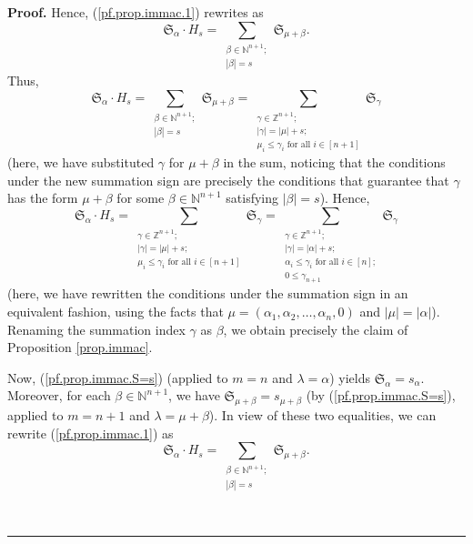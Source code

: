 \documentclass[numbers=enddot,12pt,final,onecolumn,notitlepage,english]{scrartcl}%
\theoremstyle{definition}
\newenvironment{proof}[1][Proof]{\noindent\textbf{#1.} }{\ \rule{0.5em}{0.5em}}
\let\sumnonlimits\sum
\renewcommand{\sum}{\sumnonlimits\limits}
\newenvironment{verlong}{}{}
\newenvironment{vershort}{}{}
\begin{document}
\begin{proof}
\begin{vershort}
Hence, (\ref{pf.prop.immac.1}) rewrites as
\begin{equation}
\mathfrak{S}_{\alpha}\cdot H_{s}=\sum_{\substack{\beta\in\mathbb{N}%
^{n+1};\\\left\vert \beta\right\vert =s}}\mathfrak{S}_{\mu+\beta}.
\label{pf.prop.immac.short.2}%
\end{equation}
Thus,
\[
\mathfrak{S}_{\alpha}\cdot H_{s}=\sum_{\substack{\beta\in\mathbb{N}%
^{n+1};\\\left\vert \beta\right\vert =s}}\mathfrak{S}_{\mu+\beta}%
=\sum_{\substack{\gamma\in\mathbb{Z}^{n+1};\\\left\vert \gamma\right\vert
=\left\vert \mu\right\vert +s;\\\mu_{i}\leq\gamma_{i}\text{ for all }%
i\in\left[  n+1\right]  }}\mathfrak{S}_{\gamma}%
\]
(here, we have substituted $\gamma$ for $\mu+\beta$ in the sum, noticing that
the conditions under the new summation sign are precisely the conditions that
guarantee that $\gamma$ has the form $\mu+\beta$ for some $\beta\in
\mathbb{N}^{n+1}$ satisfying $\left\vert \beta\right\vert =s$). Hence,%
\[
\mathfrak{S}_{\alpha}\cdot H_{s}=\sum_{\substack{\gamma\in\mathbb{Z}%
^{n+1};\\\left\vert \gamma\right\vert =\left\vert \mu\right\vert +s;\\\mu
_{i}\leq\gamma_{i}\text{ for all }i\in\left[  n+1\right]  }}\mathfrak{S}%
_{\gamma}=\sum_{\substack{\gamma\in\mathbb{Z}^{n+1};\\\left\vert
\gamma\right\vert =\left\vert \alpha\right\vert +s;\\\alpha_{i}\leq\gamma
_{i}\text{ for all }i\in\left[  n\right]  ;\\0\leq\gamma_{n+1}}}\mathfrak{S}%
_{\gamma}%
\]
(here, we have rewritten the conditions under the summation sign in an
equivalent fashion, using the facts that $\mu=\left(  \alpha_{1},\alpha
_{2},\ldots,\alpha_{n},0\right)  $ and $\left\vert \mu\right\vert =\left\vert
\alpha\right\vert $). Renaming the summation index $\gamma$ as $\beta$, we
obtain precisely the claim of Proposition \ref{prop.immac}. \qedhere

\end{vershort}

\begin{verlong}
Now, (\ref{pf.prop.immac.S=s}) (applied to $m=n$ and $\lambda=\alpha$) yields
$\mathfrak{S}_{\alpha}=s_{\alpha}$. Moreover, for each $\beta\in
\mathbb{N}^{n+1}$, we have $\mathfrak{S}_{\mu+\beta}=s_{\mu+\beta}$ (by
(\ref{pf.prop.immac.S=s}), applied to $m=n+1$ and $\lambda=\mu+\beta$). In
view of these two equalities, we can rewrite (\ref{pf.prop.immac.1}) as%
\begin{equation}
\mathfrak{S}_{\alpha}\cdot H_{s}=\sum_{\substack{\beta\in\mathbb{N}%
^{n+1};\\\left\vert \beta\right\vert =s}}\mathfrak{S}_{\mu+\beta}.
\label{pf.prop.immac.2}%
\end{equation}



\end{verlong}
\end{proof}
\end{document}
